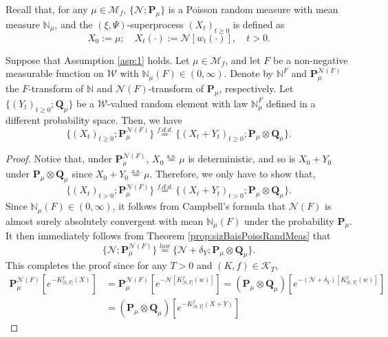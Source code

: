 	Recall that, for any $\mu\in \mathcal M_f$, $\{\mathcal N; \mathbf P_\mu\}$ is a Poisson random measure
	with mean measure $\mathbb N_\mu$,
	and the $(\xi, \Psi)$-superprocess $(X_t)_{t\ge 0}$ is defined as
\[
	X_0 := \mu;
	\quad X_t(\cdot)
	:=\mathcal N[w_t(\cdot)],
	\quad t>0.
\]
\begin{thm}\label{prop:sizBiasDecSupProc}
	Suppose that Assumption \ref{asp:1} holds.
	Let $\mu \in \mathcal M_f$, and let $F$ be a non-negative measurable function on $\mathcal W$
	with $\mathbb N_\mu(F)\in (0,\infty)$.
	Denote by $\mathbb N^F$ and $\mathbf P_\mu^{\mathcal N(F)}$ the $F$-transform of $\mathbb N$ and $\mathcal N(F)$-transform of $\mathbf P_\mu$, respectively.
	Let $\{(Y_t)_{t\geq 0}; \mathbf Q_\mu\}$ be a $\mathcal W$-valued random element with law $\mathbb N^F_\mu$ defined in a different probability space.
	Then, we have
\[
	\{(X_t)_{t\geq 0}; \mathbf P_\mu^{\mathcal N(F)}\}
	\overset{f.d.d.}{=} \{(X_t + Y_t)_{t\geq 0}; \mathbf P_\mu \otimes \mathbf Q_\mu\}.
\]
\end{thm}
\begin{proof}
	Notice that, under $\mathbf P_\mu^{\mathcal N(F)}$, $X_0\overset{\text{a.s.}}{=}\mu$ is deterministic,
	and so is $X_0+Y_0$ under  $\mathbf P_\mu \otimes \mathbf Q_\mu$ since $X_0+Y_0\overset{\text{a.s.}}=\mu$.
	Therefore, we only have to show that,
\[
	\{(X_t)_{t > 0}; \mathbf P_{\mu}^{\mathcal N(F)}\}
	\overset{f.d.d.}{=} \{(X_t + Y_t)_{t > 0}; \mathbf P_\mu\otimes \mathbf Q_\mu\}.
\]
	Since $\mathbb N_\mu(F) \in (0,\infty)$, it follows from Campbell's formula that $\mathcal N(F)$ is almost surely absolutely convergent with mean $\mathbb N_\mu(F)$ under the probability $\mathbf P_\mu$.
	It then immediately follows from Theorem \ref{prop:sizBaisPoissRandMeas} that
\[
	\{\mathcal N; \mathbf P^{\mathcal N(F)}_\mu\}
	\overset{law}{=} \{\mathcal N + \delta_Y; \mathbf P_\mu\otimes \mathbf Q_\mu\}.
\]
	This completes the proof since for any $T > 0$ and $(K,f) \in \mathcal K_T$,
\[\begin{split}
	\mathbf P_\mu^{\mathcal N(F)} [e^{-K_{(0, T]}^f(X)}]
	&= \mathbf P_\mu^{\mathcal N(F)} [e^{-\mathcal N[K_{(0, T]}^f(w)]}]
	= (\mathbf P_\mu\otimes \mathbf Q_\mu) [e^{-(\mathcal N+\delta_Y)[K_{(0, T]}^f(w)]}]\\
	&= (\mathbf P_\mu\otimes \mathbf Q_\mu) [e^{-K_{(0, T]}^f(X+Y)}]
\end{split}\]
\end{proof}

